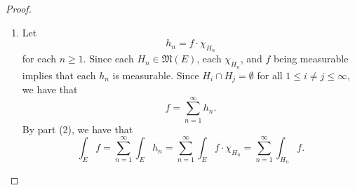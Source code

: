 \documentclass[notoc,notitlepage]{tufte-book}
\begin{document}
\begin{proof}
\begin{enumerate}
      \noindent
       Let $(a,
      \infty]$, for any $\alpha \in [0, \infty)$. Then since $g_N$ is a finite
      sum of functions, we have that
      \begin{equation*}
        g_N((a, \infty]) = h_1((a, \infty]) \cup h_2((a, \infty]) \cup \hdots
        \cup h_N((a, \infty]),
      \end{equation*}
      which is a countable union of measurable sets, and is hence measurable.

      Then
      \begin{equation*}
        0 \leq g_1 \leq g_2 \leq \hdots \leq h
      \end{equation*}
      and $\forall x \in E$
      \begin{equation*}
        \lim_{N \to \infty} g_N(x) = h(x),
      \end{equation*}
      both of which are from our assumptions.

      By the MCT and part (1), we have that
      \begin{align*}
        \int_{E} h &= \lim_{N \to \infty} \int_{E} g_N \\
                   &= \lim_{N \to \infty} \int_{E} \sum_{n=1}^{N} h_n \\
                   &= \lim_{N \to \infty} \sum_{n=1}^{N} \int_{E} h_n \\
                   &= \sum_{n=1}^{\infty} \int_{E} h_n
      \end{align*}
      as required.

    \item {} Let
      \begin{equation*}
        h_n = f \cdot \chi_{H_n}
      \end{equation*}
      for each $n \geq 1$. Since each $H_n \in \mathfrak{M}(E)$, each
      $\chi_{H_n}$, and $f$ being measurable implies that each $h_n$ is
      measurable. Since $H_i \cap H_j = \emptyset$ for all $1 \leq i \neq j \leq
      \infty$, we have that
      \begin{equation*}
        f = \sum_{n=1}^{\infty} h_n.
      \end{equation*}
      By part (2), we have that
      \begin{equation*}
        \int_{E} f = \sum_{n=1}^{\infty} \int_{E} h_n = \sum_{n=1}^{\infty}
        \int_{E} f \cdot \chi_{H_n} = \sum_{n=1}^{\infty} \int_{H_n} f.
      \end{equation*}
  \end{enumerate}
\end{proof}
\end{document}
